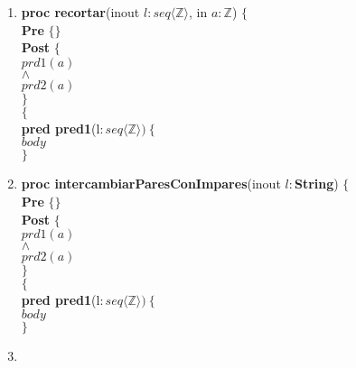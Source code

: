 \documentclass[a4paper]{article}
\begin{document}
\begin{enumerate}[label=\alph*)]
		\item
		
			\textbf{proc recortar}(inout $l:seq\langle \mathbb{Z}\rangle$, in $a:\mathbb{Z}$)
			$\{$\smallskip \\
			\hspace*{6mm} \textbf{Pre }$\{ \}$\smallskip \\
			\hspace*{6mm} \textbf{Post }$\{$\\
			\hspace*{6mm} $prd1(a)$\\
			\hspace*{6mm} $\wedge$\\
			\hspace*{6mm} $prd2(a)$\\
			\hspace*{6mm} $\}$\\
			$\{$\smallskip \\
			
			\textbf{pred pred1}(l$: seq\langle \mathbb{Z}\rangle)\ \{$\smallskip \\
			\hspace*{6mm}$body$\\
			$\}$	
			
		\item
			
			\textbf{proc intercambiarParesConImpares}(inout $l:$\textbf{String})
			$\{$\smallskip \\
			\hspace*{6mm} \textbf{Pre }$\{ \}$\smallskip \\
			\hspace*{6mm} \textbf{Post }$\{$\\
			\hspace*{6mm} $prd1(a)$\\
			\hspace*{6mm} $\wedge$\\
			\hspace*{6mm} $prd2(a)$\\
			\hspace*{6mm} $\}$\\
			$\{$\smallskip \\
			
			\textbf{pred pred1}(l$: seq\langle \mathbb{Z}\rangle)\ \{$\smallskip \\
			\hspace*{6mm}$body$\\
			$\}$	
		
		\item
		

\end{enumerate}
\end{document}
